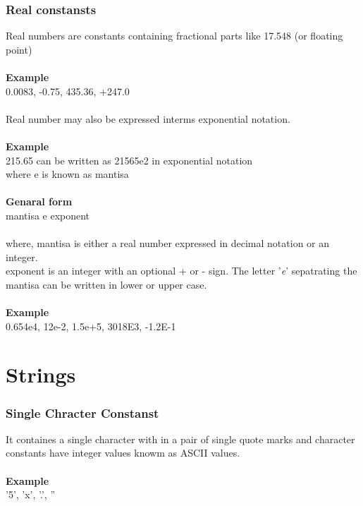 \documentclass{article}
\begin{document}
	\subsubsection{Real constansts}
	Real numbers are constants containing fractional parts like 17.548 (or floating point) 
	\\ \\
	\textbf{Example} \\
	0.0083, -0.75, 435.36, +247.0
	\\ \\
	Real number may also be expressed interms exponential notation.
	\\ \\
	\textbf{Example} \\
	215.65 can be written as 21565e2 in exponential notation \\
	where e is known as mantisa
	\\ \\
	\textbf{Genaral form} \\
	mantisa e exponent
	\\ \\
	where, mantisa is either a real number expressed in decimal notation or an integer. \\
	exponent is an integer with an optional + or - sign. The letter '\textit{e}' sepatrating the mantisa can be written in lower or upper case.
	\\ \\
	\textbf{Example} \\
	0.654e4, 12e-2, 1.5e+5, 3018E3, -1.2E-1
	
	\newpage
	
	\section{Strings}
	
	\subsubsection{Single Chracter Constanst}
	It containes a single character with in a pair of single quote marks and character constants have integer values knowm as ASCII values.
	\\ \\
	\textbf{Example} \\
	'5', 'x', '.', ''
	
\end{document}
